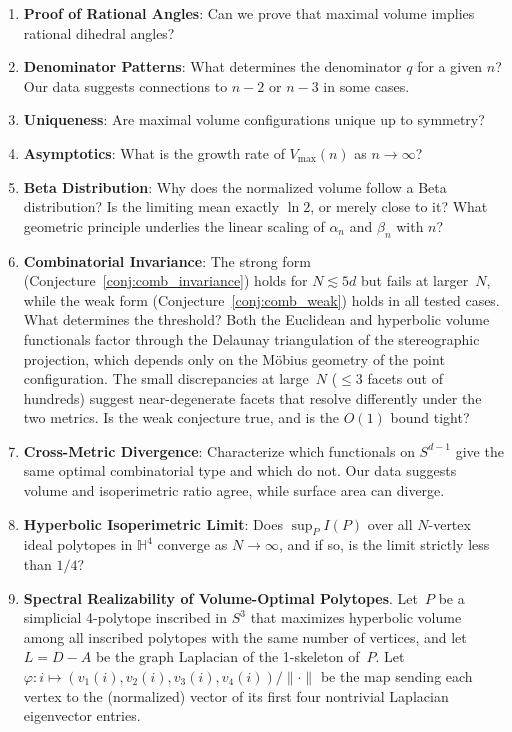 \documentclass[11pt]{article}
\begin{document}
\begin{enumerate}
    \item \textbf{Proof of Rational Angles}: Can we prove that maximal volume implies rational dihedral angles?

    \item \textbf{Denominator Patterns}: What determines the denominator $q$ for a given $n$? Our data suggests connections to $n-2$ or $n-3$ in some cases.

    \item \textbf{Uniqueness}: Are maximal volume configurations unique up to symmetry?

    \item \textbf{Asymptotics}: What is the growth rate of $V_{\max}(n)$ as $n \to \infty$?

    \item \textbf{Beta Distribution}: Why does the normalized volume follow a Beta distribution? Is the limiting mean exactly $\ln 2$, or merely close to it? What geometric principle underlies the linear scaling of $\alpha_n$ and $\beta_n$ with $n$?

    \item \textbf{Combinatorial Invariance}: The strong form (Conjecture~\ref{conj:comb_invariance}) holds for $N \lesssim 5d$ but fails at larger~$N$, while the weak form (Conjecture~\ref{conj:comb_weak}) holds in all tested cases.  What determines the threshold?  Both the Euclidean and hyperbolic volume functionals factor through the Delaunay triangulation of the stereographic projection, which depends only on the M\"obius geometry of the point configuration.  The small discrepancies at large~$N$ ($\leq 3$ facets out of hundreds) suggest near-degenerate facets that resolve differently under the two metrics.  Is the weak conjecture true, and is the $O(1)$ bound tight?

    \item \textbf{Cross-Metric Divergence}: Characterize which functionals on $S^{d-1}$ give the same optimal combinatorial type and which do not. Our data suggests volume and isoperimetric ratio agree, while surface area can diverge.

    \item \textbf{Hyperbolic Isoperimetric Limit}: Does $\sup_P I(P)$ over all $N$-vertex ideal polytopes in $\mathbb{H}^4$ converge as $N \to \infty$, and if so, is the limit strictly less than $1/4$?

    \item \textbf{Spectral Realizability of Volume-Optimal Polytopes}.
    Let~$P$ be a simplicial 4-polytope inscribed in $S^3$ that
    maximizes hyperbolic volume among all inscribed polytopes with
    the same number of vertices, and let $L = D - A$ be the graph
    Laplacian of the 1-skeleton of~$P$.  Let
    $\varphi\colon i \mapsto (v_1(i), v_2(i), v_3(i), v_4(i)) / \|{\cdot}\|$
    be the map sending each vertex to the (normalized) vector of its
    first four nontrivial Laplacian eigenvector entries.


\end{enumerate}
\end{document}
